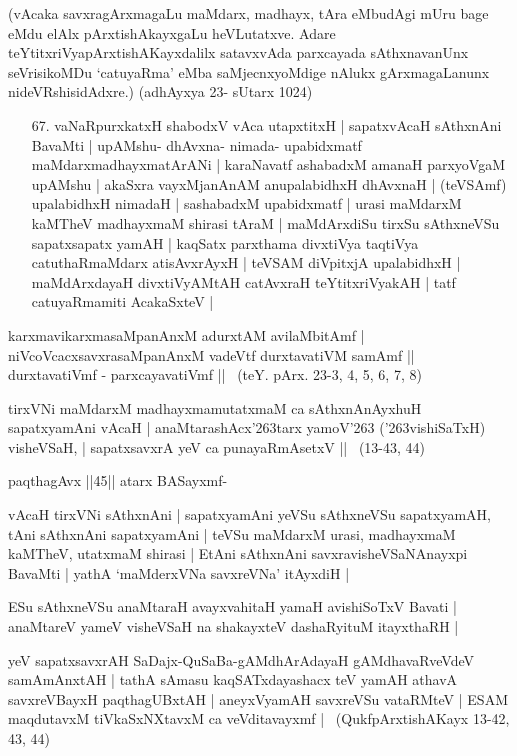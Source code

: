 (vAcaka savxragArxmagaLu maMdarx, madhayx, tAra eMbudAgi mUru bage eMdu elAlx pArxtishAkayxgaLu heVLutatxve. Adare teYtitxriVyapArxtishAKayxdalilx satavxvAda parxcayada sAthxnavanUnx seVrisikoMDu `catuyaRma' eMba saMjecnxyoMdige nAlukx gArxmagaLanunx nideVRshisidAdxre.) (adhAyxya 23- sUtarx 1024)

\begin{itemize}
\item[67.] vaNaRpurxkatxH shabodxV vAca utapxtitxH | sapatxvAcaH sAthxnAni BavaMti |\label{153}
upAMshu- dhAvxna- nimada- upabidxmatf maMdarxmadhayxmatArANi | karaNavatf
ashabadxM amanaH parxyoVgaM upAMshu | akaSxra vayxMjanAnAM anupalabidhxH dhAvxnaH |
(teVSAmf) upalabidhxH nimadaH | sashabadxM upabidxmatf | urasi maMdarxM kaMTheV madhayxmaM shirasi tAraM | maMdArxdiSu tirxSu sAthxneVSu sapatxsapatx yamAH | kaqSatx parxthama divxtiVya taqtiVya catuthaRmaMdarx atisAvxrAyxH | teVSAM diVpitxjA upalabidhxH | maMdArxdayaH divxtiVyAMtAH catAvxraH teYtitxriVyakAH | tatf catuyaRmamiti AcakaSxteV |
\end{itemize}

\begin{shloka}
karxmavikarxmasaMpanAnxM adurxtAM avilaMbitAmf |\\
niVcoVcacxsavxrasaMpanAnxM vadeVtf durxtavatiVM samAmf ||\\
durxtavatiVmf - parxcayavatiVmf || ~(teY. pArx. 23-3, 4, 5, 6, 7, 8)
\end{shloka}

tirxVNi maMdarxM madhayxmamutatxmaM ca sAthxnAnAyxhuH sapatxyamAni vAcaH |\label{154}
anaMtarashAcx\char'263tarx yamoV\char'263 (\char'263vishiSaTxH) visheVSaH, |
sapatxsavxrA yeV ca punayaRmAsetxV || ~(13-43, 44)


paqthagAvx ||45|| atarx BASayxmf-

vAcaH tirxVNi sAthxnAni | sapatxyamAni yeVSu sAthxneVSu sapatxyamAH, tAni sAthxnAni sapatxyamAni | teVSu maMdarxM urasi, madhayxmaM kaMTheV, utatxmaM shirasi | EtAni sAthxnAni savxravisheVSaNAnayxpi BavaMti | yathA `maMderxVNa savxreVNa' itAyxdiH |

\begin{shloka}
ESu sAthxneVSu anaMtaraH avayxvahitaH yamaH avishiSoTxV Bavati |\\
anaMtareV yameV visheVSaH na shakayxteV dashaRyituM itayxthaRH |
\end{shloka}

yeV sapatxsavxrAH SaDajx-QuSaBa-gAMdhArAdayaH gAMdhavaRveVdeV samAmAnxtAH | tathA sAmasu kaqSATxdayashacx teV yamAH athavA savxreVBayxH paqthagUBxtAH | aneyxVyamAH savxreVSu vataRMteV | ESAM maqdutavxM tiVkaSxNXtavxM ca veVditavayxmf | ~(QukfpArxtishAKayx 13-42, 43, 44)

